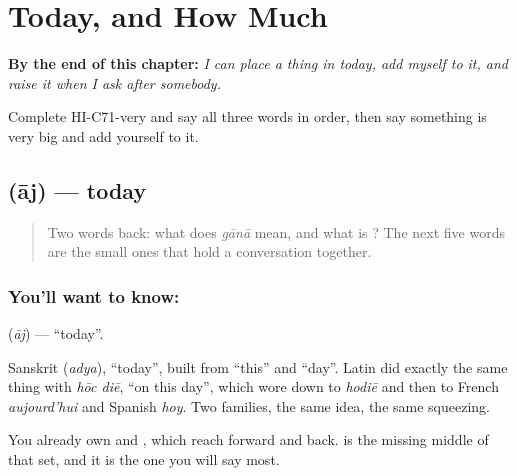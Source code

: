 
\chapter{Today, and How Much}
\label{ch:hi-today-and-how-much}

\begin{chapteropening}
\textbf{By the end of this chapter:} \emph{I can place a thing in today, add myself to it, and raise it when I ask after somebody.}

Complete HI-C71-very and say all three words in order, then say something is very big and add yourself to it.
\end{chapteropening}

\section[\texorpdfstring{\hi{आज} (āj)}{आज (āj)}]{ (āj) — today}

\label{lesson:HI-C71-today}



\begin{quote}
Two words back: what does \emph{gānā} mean, and what is \textbf{}? The next five words are the small ones that hold a conversation together.
\end{quote}

\subsection*{You'll want to know: }
\textbf{} (\emph{āj}) — \textquotedblleft{}today\textquotedblright{}.

Sanskrit  (\emph{adya}), \textquotedblleft{}today\textquotedblright{}, built from \textquotedblleft{}this\textquotedblright{} and \textquotedblleft{}day\textquotedblright{}. Latin did exactly the same thing with \emph{hōc diē}, \textquotedblleft{}on this day\textquotedblright{}, which wore down to \emph{hodiē} and then to French \emph{aujourd'hui} and Spanish \emph{hoy}. Two families, the same idea, the same squeezing.

You already own \textbf{} and \textbf{}, which reach forward and back.  is the missing middle of that set, and it is the one you will say most.


